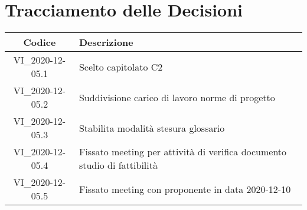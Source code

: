 \section*{Tracciamento delle Decisioni}

\begin{center}
	\begin{longtable}{|c|p{14.5cm}|}
	\hline
	\rowcolor{lighter-grayer}
	\textbf{Codice} & \textbf{Descrizione} \\
	\hline
	\endfirsthead

	\hline
	VI\_2020-12-05.1 & Scelto capitolato C2 \\
	VI\_2020-12-05.2 & Suddivisione carico di lavoro norme di progetto \\
	VI\_2020-12-05.3 & Stabilita modalità stesura glossario \\
	VI\_2020-12-05.4 & Fissato meeting per attività di verifica documento studio di fattibilità \\
	VI\_2020-12-05.5 & Fissato meeting con proponente in data 2020-12-10 \\
	\hline

	\end{longtable}
\end{center}